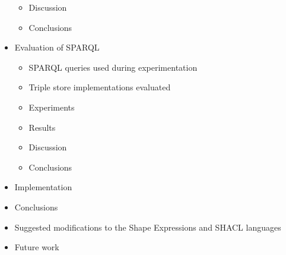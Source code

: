 \documentclass[a4paper, 10pt]{article}
\begin{document}
\begin{itemize}
\begin{itemize}
    \item Discussion

    \item Conclusions
  \end{itemize}

  \item Evaluation of SPARQL

  \begin{itemize}
    \item SPARQL queries used during experimentation
    \item Triple store implementations evaluated
    \item Experiments
    \item Results
    \item Discussion
    \item Conclusions
  \end{itemize}

  \item Implementation

  \item Conclusions

  \item Suggested modifications to the Shape Expressions and SHACL languages

  \item Future work
\end{itemize}
\end{document}
